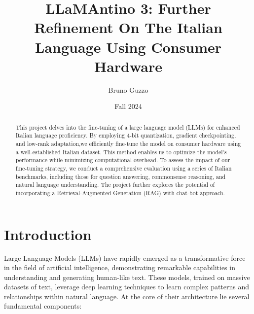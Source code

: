 \documentclass{article}
\title{LLaMAntino 3: Further Refinement On The Italian Language Using Consumer Hardware}
\author{Bruno Guzzo}
\date{Fall 2024}
\begin{document}
	
	\maketitle
	
	\begin{abstract}
		This project delves into the fine-tuning of a large language model (LLMs) for enhanced Italian language proficiency. 
		By employing 4-bit quantization, gradient checkpointing, and low-rank adaptation,we efficiently fine-tune the model on consumer hardware using a well-established Italian dataset.
		This method enables us to optimize the model's performance while minimizing computational overhead.
		To assess the impact of our fine-tuning strategy, we conduct a comprehensive evaluation using a series of Italian benchmarks, including those for question answering, commonsense reasoning, and natural language understanding.
		The project further explores the potential of incorporating a Retrieval-Augmented Generation (RAG) with chat-bot approach.
	\end{abstract}
	
	\section{Introduction}
		Large Language Models (LLMs) have rapidly emerged as a transformative force in the field of artificial intelligence, demonstrating remarkable capabilities in understanding and generating human-like text. 
		These models, trained on massive datasets of text, leverage deep learning techniques to learn complex patterns and relationships within natural language. 
		At the core of their architecture lie several fundamental components:
		
\end{document}
